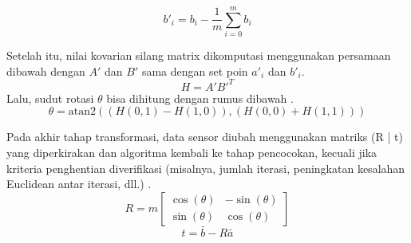 \begin{equation}
b'_i = b_i - \frac{1}{m} \sum_{i=0}^{m} b_i
\end{equation}

Setelah itu, nilai kovarian silang matrix dikomputasi menggunakan persamaan dibawah dengan $A'$ dan $B'$ sama dengan set poin $a'_i$ dan $b'_i$.
\begin{equation}
H = A'B'^T
\end{equation}
Lalu, sudut rotasi $\theta$ bisa dihitung dengan rumus dibawah .
\begin{equation}
\theta = \text{atan2}((H(0, 1) - H(1, 0)), (H(0, 0) + H(1, 1)))
\end{equation}

Pada akhir tahap transformasi, data sensor diubah menggunakan matriks (R | t) yang diperkirakan dan algoritma kembali ke tahap pencocokan, kecuali jika kriteria penghentian diverifikasi (misalnya, jumlah iterasi, peningkatan kesalahan Euclidean antar iterasi, dll.) \parencite[]{sobreira2019map}.
\begin{equation}
R = m \begin{bmatrix} \cos(\theta) & -\sin(\theta) \\ \sin(\theta) & \cos(\theta) \end{bmatrix}
\end{equation}
\begin{equation}
t = \bar{b} - R\bar{a}
\end{equation}

